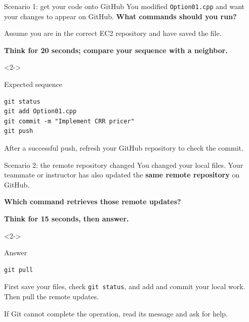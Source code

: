 \documentclass[10pt,aspectratio=169]{beamer}
\newcommand{\gitcmd}[1]{{\color{BootcampBlueDark}\texttt{#1}}}
\begin{document}
\begin{frame}[t,fragile]{Scenario 1: get your code onto GitHub}
  You modified \texttt{Option01.cpp} and want your changes to appear on GitHub.
  \textbf{What commands should you run?}\par
  \smallskip
  {\small Assume you are in the correct EC2 repository and have saved the file.\par}
  \smallskip
  {\small\textbf{Think for 20 seconds; compare your sequence with a neighbor.}\par}
    \begin{uncoverenv}<2->
      \begin{exampleblock}{Expected sequence}
\begin{lstlisting}
git status
git add Option01.cpp
git commit -m "Implement CRR pricer"
git push
\end{lstlisting}
      \end{exampleblock}
      {\small After a successful push, refresh your GitHub repository to check the commit.}
    \end{uncoverenv}
\end{frame}

\begin{frame}[t,fragile]{Scenario 2: the remote repository changed}
  You changed your local files. Your teammate or instructor has also updated
  the \textbf{same remote repository} on GitHub.
  \medskip\par
  \textbf{Which command retrieves those remote updates?}\par
  \smallskip
  {\small\textbf{Think for 15 seconds, then answer.}\par}
    \begin{uncoverenv}<2->
      \begin{exampleblock}{Answer}
\begin{lstlisting}
git pull
\end{lstlisting}
        First save your files, check \gitcmd{git status}, and add and commit your local work.
        Then pull the remote updates.
      \end{exampleblock}
      \smallskip
      {\small If Git cannot complete the operation, read its message and ask for help.}
    \end{uncoverenv}
\end{frame}
\end{document}
